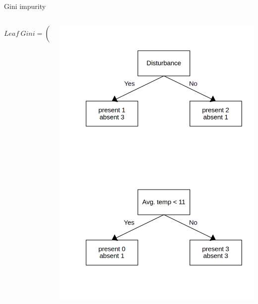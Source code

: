 \documentclass{irdbeamer}
\begin{document}
\begin{frame}{Gini impurity}
\begin{columns}
    \begin{column}{0.5\textwidth}
\centering
$$
        Leaf~Gini = (\frac{4}{4+3})0.375
 $$
    \end{column}
    \begin{column}{0.5\textwidth}
\centering
    \includegraphics[width=.8\textwidth]{./figs/schemas/gini.png}%
\end{column}
\end{columns}
\end{frame}
\end{document}
